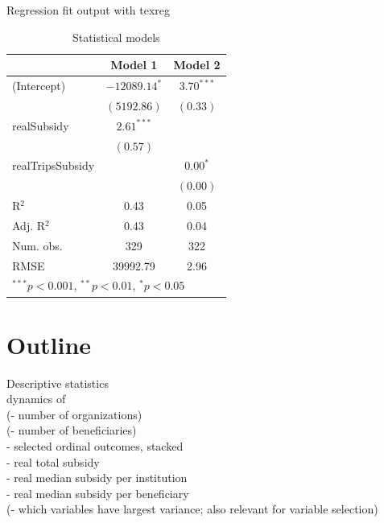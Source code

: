 \documentclass[12pt, a4paper, titlepage]{article}\usepackage[]{graphicx}\usepackage[]{color}
\begin{document}
Regression fit output with texreg\\


\begin{table}
\begin{center}
\begin{tabular}{l c c }
\hline
 & Model 1 & Model 2 \\
\hline
(Intercept)      & $-12089.14^{*}$ & $3.70^{***}$ \\
                 & $(5192.86)$     & $(0.33)$     \\
realSubsidy      & $2.61^{***}$    &              \\
                 & $(0.57)$        &              \\
realTripsSubsidy &                 & $0.00^{*}$   \\
                 &                 & $(0.00)$     \\
\hline
R$^2$            & 0.43            & 0.05         \\
Adj. R$^2$       & 0.43            & 0.04         \\
Num. obs.        & 329             & 322          \\
RMSE             & 39992.79        & 2.96         \\
\hline
\multicolumn{3}{l}{\scriptsize{$^{***}p<0.001$, $^{**}p<0.01$, $^*p<0.05$}}
\end{tabular}
\caption{Statistical models}
\label{table:coefficients}
\end{center}
\end{table}


\section{Outline}
Descriptive statistics\\
dynamics of\\ 
(- number of organizations)\\
(- number of beneficiaries)\\
- selected ordinal outcomes, stacked\\
- real total subsidy\\
- real median subsidy per institution\\
- real median subsidy per beneficiary\\
(- which variables have largest variance; also relevant for variable selection)\\
\end{document}
